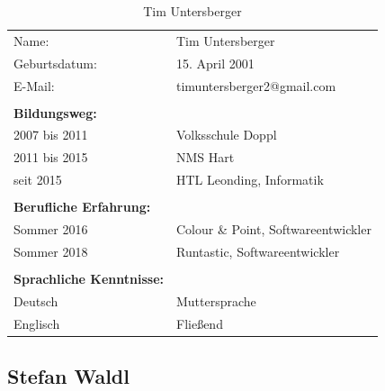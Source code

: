 \begin{table}[htb]
\begin{tabular}{ll}
Name:                            & Tim Untersberger          \\
Geburtsdatum:                    & 15. April 2001                   \\
E-Mail:                          & timuntersberger2@gmail.com          \\
                                 &                               \\
\textbf{Bildungsweg:}            &                               \\  
2007 bis 2011                    & Volksschule Doppl          \\
2011 bis 2015                    & NMS Hart     \\
seit 2015                        & HTL Leonding, Informatik      \\
                                 &                               \\
\textbf{Berufliche Erfahrung:}   &                               \\
Sommer 2016                      & {Colour \& Point}, Softwareentwickler \\
Sommer 2018                      & Runtastic, Softwareentwickler \\
                                 &                               \\
\textbf{Sprachliche Kenntnisse:} &                               \\
Deutsch                          & Muttersprache                 \\
Englisch                         & Fließend                     
\end{tabular}
\caption{Tim Untersberger}
\end{table}
\pagebreak
\subsection*{Stefan Waldl}
